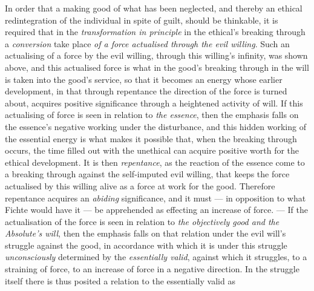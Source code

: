 \documentclass[12pt,a4paper]{book}
\begin{document}
In order that a making good of what has been neglected, and thereby an ethical
redintegration of the individual in spite of guilt, should be thinkable, it is
required that in the \emph{transformation in principle} in the ethical's
breaking through a \emph{conversion} take place \emph{of a force actualised
through the evil willing}. Such an actualising of a force by the evil willing,
through this willing's infinity, was shown above,
and this actualised force is what in the good's breaking through in the will is
taken into the good's service, so that it becomes an energy whose earlier
development, in that through repentance the direction of the force is turned
about, acquires positive significance through a heightened activity of will. If
this actualising of force is seen in relation to \emph{the essence}, then the
emphasis falls on the essence's negative working under the disturbance, and this
hidden working of the essential energy is what makes it possible that, when the
breaking through occurs, the time filled out with the unethical can acquire
positive worth for the ethical development. It is then \emph{repentance}, as the
reaction of the essence come to a breaking through against the self-imputed evil
willing, that keeps the force actualised by this willing alive as a force at
work for the good. Therefore repentance acquires an \emph{abiding} significance,
and it must --- in opposition to what Fichte would have it --- be apprehended as
effecting an increase of force. --- If the actualisation of the force is seen in
relation to \emph{the objectively good and the Absolute's will}, then the
emphasis falls on that relation under the evil will's struggle against the good,
in accordance with which it is under this struggle \emph{unconsciously}
determined by the \emph{essentially valid}, against which it struggles, to a
straining of force, to an increase of force in a negative direction. In the
struggle itself there is thus posited a relation to the essentially valid as
\end{document}
